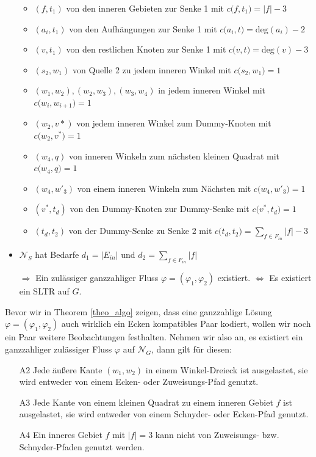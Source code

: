 \begin{network}[SLTR]
\begin{itemize}
\begin{itemize}
		\item $(f,t_1)$ von den inneren Gebieten zur Senke 1 mit $c\big(f,t_1\big) = |f|-3$
		\item $(a_i,t_1)$ von den Aufhängungen zur Senke 1 mit $c\big(a_i,t\big) = \text{deg}(a_i)-2$
		\item $(v,t_1)$ von den restlichen Knoten zur Senke 1 mit $c\big(v,t\big) = \text{deg}(v)-3$		
		\item $(s_2,w_1)$ von Quelle 2 zu jedem inneren Winkel mit $c\big(s_2,w_1\big) = 1$
		\item $(w_1,w_2),(w_2,w_3),(w_3,w_4)$ in jedem inneren Winkel mit $c\big(w_i,w_{i+1}\big) = 1$
		\item $(w_2,v*)$ von jedem inneren Winkel zum Dummy-Knoten mit $c\big(w_2,v^*\big) = 1$
		\item $(w_4,q)$ von inneren Winkeln zum nächsten kleinen Quadrat mit $c\big(w_4,q\big) = 1$
		\item $(w_4,w'_3)$ von einem inneren Winkeln zum Nächsten mit $c\big(w_4,w'_3\big) = 1$
		\item $(v^*,t_d)$ von den Dummy-Knoten zur Dummy-Senke mit $c\big(v^*,t_d\big) = 1$
		\item $(t_d,t_2)$ von der Dummy-Senke zu Senke 2 mit $c\big(t_d,t_2\big) = \sum_{f \in F_{in}}|f|-3$
		\end{itemize}
	\item $\mathcal{N}_S$ hat Bedarfe $d_1=|E_{in}|$ und $d_2 = \sum_{f \in F_{in}}|f|$
	\item [$\Rightarrow$] Ein zulässiger ganzzahliger Fluss $\varphi = (\varphi_1,\varphi_2)$ existiert. $\Leftrightarrow$ Es existiert ein SLTR  auf $G$.
	\end{itemize}
\end{network}	

Bevor wir in Theorem \ref{theo_algo} zeigen, dass eine ganzzahlige Lösung $\varphi=(\varphi_1,\varphi_2)$ auch wirklich ein Ecken kompatibles Paar kodiert, wollen wir noch ein Paar weitere Beobachtungen festhalten. Nehmen wir also an, es existiert ein ganzzahliger zulässiger Fluss $\varphi$ auf $\mathcal{N}_G$, dann gilt für diesen:
\begin{itemize}
\item [A2] Jede äußere Kante $(w_1,w_2)$ in einem Winkel-Dreieck ist ausgelastet, sie wird entweder von einem Ecken- oder Zuweisungs-Pfad genutzt.
\item [A3] Jede Kante von einem kleinen Quadrat zu einem inneren Gebiet $f$ ist ausgelastet, sie wird entweder von einem Schnyder- oder Ecken-Pfad genutzt.
\item [A4] Ein inneres Gebiet $f$ mit $|f|=3$ kann nicht von Zuweisungs- bzw. Schnyder-Pfaden genutzt werden.
\end{itemize}

